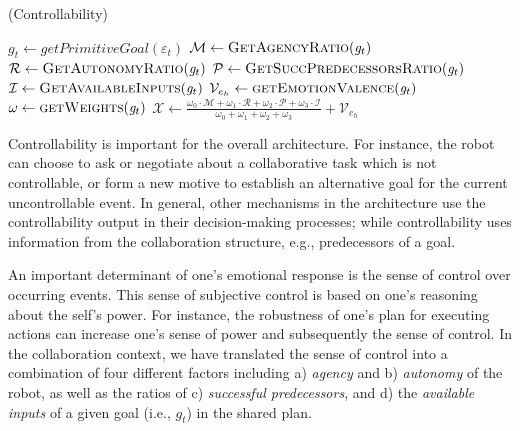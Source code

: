 \documentclass[12pt]{report}
\begin{document}
\begin{algorithm}
	\caption{(Controllability)}
	\label{alg:controllability}
	\begin{algorithmic}[1]
 			\State $\mathit{g}_{t} \gets \textit{getPrimitiveGoal}{(\varepsilon_t)}$
  			\Statex
			\State $\mathcal{M} \gets \Call{GetAgencyRatio}{\mathit{g}_{t}}$ 
			\State $\mathcal{R} \gets \Call{GetAutonomyRatio}{\mathit{g}_{t}}$
 			\Statex
			\State $\mathcal{P} \gets \Call{GetSuccPredecessorsRatio}{\mathit{g}_{t}}$
			\State $\mathcal{I} \gets \Call{GetAvailableInputs}{\mathit{g}_{t}}$
  			\Statex
			\State $\mathcal{V}_{e_h} \gets \Call{getEmotionValence}{\mathit{g}_{t}}$ 
			\State $\omega \gets \Call{getWeights}{\mathit{g}_{t}}$
			\Statex
			\State $\mathcal{X} \gets
			\frac{\omega_{0}\cdot \mathcal{M} + \omega_{1}\cdot \mathcal{R} +
			\omega_{2}\cdot \mathcal{P} + \omega_{3}\cdot \mathcal{I}}{\omega_{0} +
			\omega_{1} + \omega_{2} + \omega_{3}} + \mathcal{V}_{e_h}$
  			\Statex
 			\Statex
 				\State {}
			\Else 
 				\State {}
			\EndIf
		\EndFunction
	\end{algorithmic}
\end{algorithm}

Controllability is important for the overall architecture. For instance, the
robot can choose to ask or negotiate about a collaborative task which is not
controllable, or form a new motive to establish an alternative goal for the
current uncontrollable event. In general, other mechanisms in the architecture
use the controllability output in their decision-making processes; while
controllability uses information from the collaboration structure, e.g.,
predecessors of a goal.

An important determinant of one's emotional response is the sense of control
over occurring events. This sense of subjective control is based on one's
reasoning about the self's power. For instance, the robustness of one's plan for
executing actions can increase one's sense of power and subsequently the sense
of control. In the collaboration context, we have translated the sense of control
into a combination of four different factors including a) \textit{agency} and b)
\textit{autonomy} of the robot, as well as the ratios of c) \textit{successful
predecessors}, and d) the \textit{available inputs} of a given goal
(i.e., $\mathit{g}_{t}$) in the shared plan.
\end{document}
